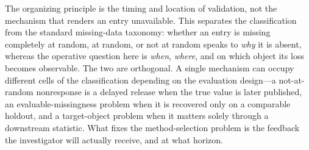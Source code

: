\documentclass[a4paper, 12pt]{article}
\theoremstyle{plain}
\theoremstyle{remark}
\newcommand{\1}{\mathbf{1}}
\begin{document}
The organizing principle is the timing and location of validation, not the mechanism that renders an entry unavailable. This separates the classification from the standard missing-data taxonomy: whether an entry is missing completely at random, at random, or not at random speaks to \emph{why} it is absent, whereas the operative question here is \emph{when}, \emph{where}, and on which object its loss becomes observable. The two are orthogonal. A single mechanism can occupy different cells of the classification depending on the evaluation design---a not-at-random nonresponse is a delayed release when the true value is later published, an evaluable-missingness problem when it is recovered only on a comparable holdout, and a target-object problem when it matters solely through a downstream statistic. What fixes the method-selection problem is the feedback the investigator will actually receive, and at what horizon.
\end{document}
